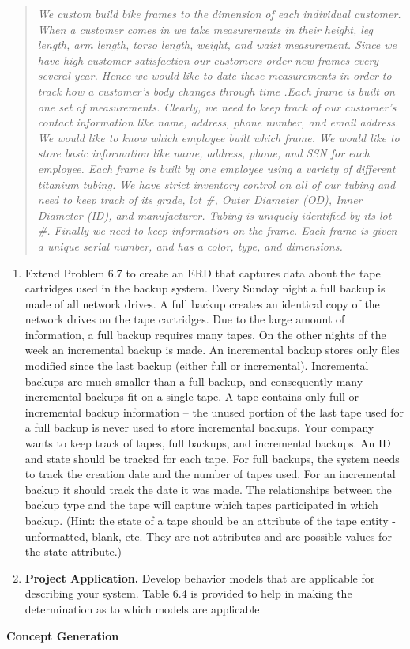 \begin{quote}
\emph{We custom build bike frames to the dimension of each individual
customer. When a customer comes in we take measurements in their height,
leg length, arm length, torso length, weight, and waist measurement.
Since we have high customer satisfaction our customers order new frames
every several year. Hence we would like to date these measurements in
order to track how a customer's body changes through time .Each frame is
built on one set of measurements. Clearly, we need to keep track of our
customer's contact information like name, address, phone number, and
email address. We would like to know which employee built which frame.
We would like to store basic information like name, address, phone, and
SSN for each employee. Each frame is built by one employee using a
variety of different titanium tubing. We have strict inventory control
on all of our tubing and need to keep track of its grade, lot \#, Outer
Diameter (OD), Inner Diameter (ID), and manufacturer. Tubing is uniquely
identified by its lot \#. Finally we need to keep information on the
frame. Each frame is given a unique serial number, and has a color,
type, and dimensions.}
\end{quote}

\begin{enumerate}
\def\labelenumi{\arabic{enumi}.}
\setcounter{enumi}{1}
\item
  Extend Problem 6.7 to create an ERD that captures data about the tape
  cartridges used in the backup system. Every Sunday night a full backup
  is made of all network drives. A full backup creates an identical copy
  of the network drives on the tape cartridges. Due to the large amount
  of information, a full backup requires many tapes. On the other nights
  of the week an incremental backup is made. An incremental backup
  stores only files modified since the last backup (either full or
  incremental). Incremental backups are much smaller than a full backup,
  and consequently many incremental backups fit on a single tape. A tape
  contains only full or incremental backup information -- the unused
  portion of the last tape used for a full backup is never used to store
  incremental backups. Your company wants to keep track of tapes, full
  backups, and incremental backups. An ID and state should be tracked
  for each tape. For full backups, the system needs to track the
  creation date and the number of tapes used. For an incremental backup
  it should track the date it was made. The relationships between the
  backup type and the tape will capture which tapes participated in
  which backup. (Hint: the state of a tape should be an attribute of the
  tape entity - unformatted, blank, etc. They are not attributes and are
  possible values for the state attribute.)
\item
  \textbf{Project Application.} Develop behavior models that are
  applicable for describing your system. Table 6.4 is provided to help
  in making the determination as to which models are applicable
\end{enumerate}

\textbf{Concept Generation}
